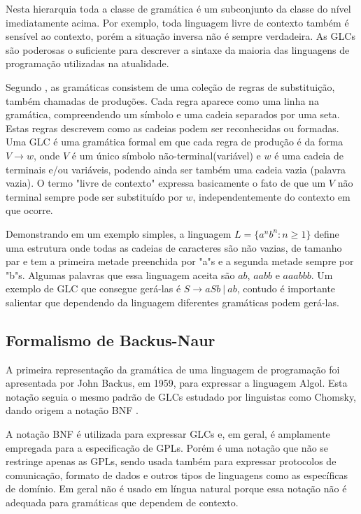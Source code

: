 Nesta hierarquia toda a classe de gramática é um subconjunto da classe do nível imediatamente acima. 
Por exemplo, toda linguagem livre de contexto também é sensível ao contexto, porém a situação inversa não é sempre verdadeira. 
As \acp{GLC} são poderosas o suficiente para descrever a sintaxe da maioria das linguagens de programação utilizadas na atualidade.

Segundo , as gramáticas consistem de uma coleção de regras de substituição, também chamadas de produções. 
Cada regra aparece como uma linha na gramática, compreendendo um símbolo e uma cadeia separados por uma seta. 
Estas regras descrevem como as cadeias podem ser reconhecidas ou formadas. 
Uma \ac{GLC} é uma gramática formal em que cada regra de produção é da forma $V \rightarrow w$, onde $V$ é um único símbolo não-terminal(variável) e $w$ é uma cadeia de terminais e/ou variáveis, podendo ainda ser também uma cadeia vazia (palavra vazia). 
O termo "livre de contexto" expressa basicamente o fato de que um $V$ não terminal sempre pode ser substituído por $w$, independentemente do contexto em que ocorre.

Demonstrando em um exemplo simples, a linguagem $L=\{a^{n}b^{n}:n \geq 1\}$ define uma estrutura onde todas as cadeias de caracteres são não vazias, de tamanho par e tem a primeira metade preenchida por "a"s e a segunda metade sempre por "b"s. 
Algumas palavras que essa linguagem aceita são $ab$, $aabb$ e $aaabbb$.
Um exemplo de \ac{GLC} que consegue gerá-las é  ${S\to aSb~|~ab}$, contudo é importante salientar que dependendo da linguagem diferentes gramáticas podem gerá-las.

\subsection{Formalismo de Backus-Naur} \label{sssec:BNF}

A primeira representação da gramática de uma linguagem de programação foi apresentada por John Backus, em 1959, para expressar a linguagem 
Algol. Esta notação seguia o mesmo padrão de \acp{GLC} estudado por linguistas como Chomsky, dando origem a notação \ac{BNF} \cite{Edelweiss:2014}.

A notação \ac{BNF} é utilizada para expressar \acp{GLC} e, em geral, é amplamente empregada para a especificação de \acp{GPL}. 
Porém é uma notação que não se restringe apenas as \acp{GPL}, sendo usada também para expressar protocolos de comunicação, formato de dados e outros tipos de linguagens como as específicas de domínio. 
Em geral não é usado em língua natural porque essa notação não é adequada para gramáticas que dependem de contexto.


